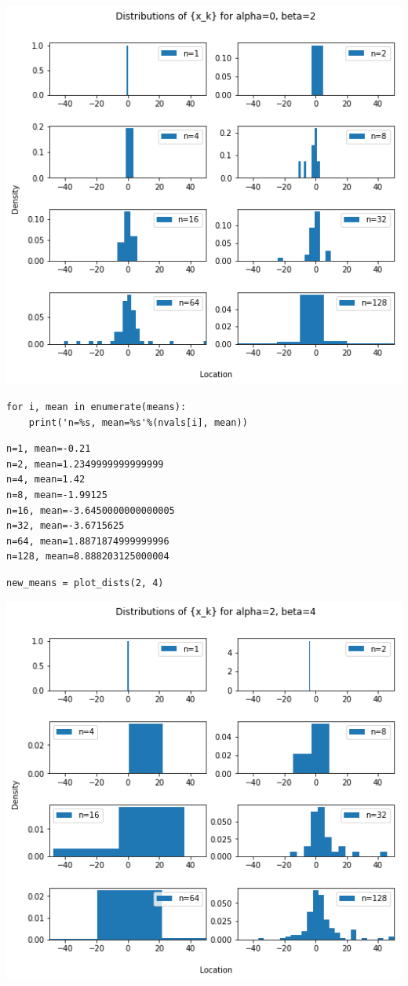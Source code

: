 \documentclass[11pt]{article}
\begin{document}
\includegraphics[width=.9\linewidth]{./obipy-resources/322i7o.png}

\begin{verbatim}
for i, mean in enumerate(means):
    print('n=%s, mean=%s'%(nvals[i], mean))
\end{verbatim}

\begin{verbatim}
n=1, mean=-0.21
n=2, mean=1.2349999999999999
n=4, mean=1.42
n=8, mean=-1.99125
n=16, mean=-3.6450000000000005
n=32, mean=-3.6715625
n=64, mean=1.8871874999999996
n=128, mean=8.888203125000004
\end{verbatim}


\begin{verbatim}
new_means = plot_dists(2, 4)
\end{verbatim}

\includegraphics[width=.9\linewidth]{./obipy-resources/322vFv.png}
\end{document}
